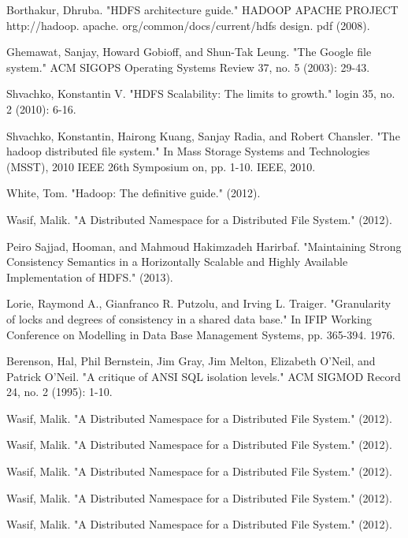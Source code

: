 \documentclass[runningheads,a4paper]{llncs}
\begin{document}
\begin{thebibliography}{4}

 Borthakur, Dhruba. "HDFS architecture guide." HADOOP APACHE PROJECT http://hadoop. apache. org/common/docs/current/hdfs design. pdf (2008).

 Ghemawat, Sanjay, Howard Gobioff, and Shun-Tak Leung. "The Google file system." ACM SIGOPS Operating Systems Review 37, no. 5 (2003): 29-43.

 Shvachko, Konstantin V. "HDFS Scalability: The limits to growth." login 35, no. 2 (2010): 6-16.

 Shvachko, Konstantin, Hairong Kuang, Sanjay Radia, and Robert Chansler. "The hadoop distributed file system." In Mass Storage Systems and Technologies (MSST), 2010 IEEE 26th Symposium on, pp. 1-10. IEEE, 2010.

 White, Tom. "Hadoop: The definitive guide." (2012).

 Wasif, Malik. "A Distributed Namespace for a Distributed File System." (2012).

 Peiro Sajjad, Hooman, and Mahmoud Hakimzadeh Harirbaf. "Maintaining Strong Consistency Semantics in a Horizontally Scalable and Highly Available Implementation of HDFS." (2013).

 Lorie, Raymond A., Gianfranco R. Putzolu, and Irving L. Traiger. "Granularity of locks and degrees of consistency in a shared data base." In IFIP Working Conference on Modelling in Data Base Management Systems, pp. 365-394. 1976.

 Berenson, Hal, Phil Bernstein, Jim Gray, Jim Melton, Elizabeth O'Neil, and Patrick O'Neil. "A critique of ANSI SQL isolation levels." ACM SIGMOD Record 24, no. 2 (1995): 1-10.

 Wasif, Malik. "A Distributed Namespace for a Distributed File System." (2012).

 Wasif, Malik. "A Distributed Namespace for a Distributed File System." (2012).

 Wasif, Malik. "A Distributed Namespace for a Distributed File System." (2012).

 Wasif, Malik. "A Distributed Namespace for a Distributed File System." (2012).

 Wasif, Malik. "A Distributed Namespace for a Distributed File System." (2012).

\end{thebibliography}
\end{document}
